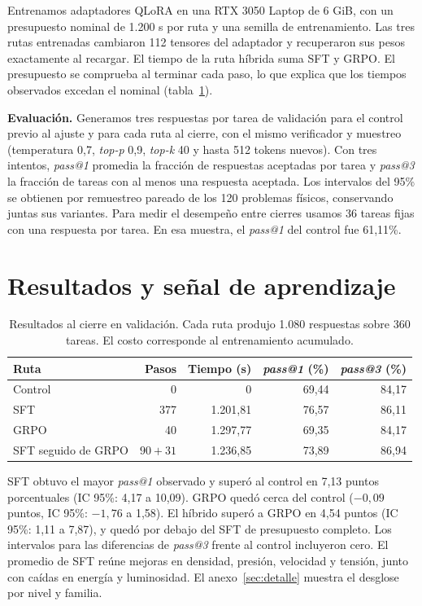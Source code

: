 Entrenamos adaptadores QLoRA en una RTX 3050 Laptop de 6 GiB, con un presupuesto
nominal de 1.200 s por ruta y una semilla de entrenamiento. Las tres rutas
entrenadas cambiaron 112 tensores del adaptador y recuperaron sus pesos
exactamente al recargar. El tiempo de la ruta híbrida suma SFT y GRPO. El
presupuesto se comprueba al terminar cada paso, lo que explica que los tiempos
observados excedan el nominal (tabla~\ref{tab:resultado}).

\textbf{Evaluación.} Generamos tres respuestas por tarea de validación para el
control previo al ajuste y para cada ruta al cierre, con el mismo verificador
y muestreo (temperatura 0,7, \textit{top-p} 0,9, \textit{top-k} 40 y hasta 512
tokens nuevos). Con tres intentos, \textit{pass@1} promedia la fracción de respuestas
aceptadas por tarea y \textit{pass@3} la fracción de tareas con al menos una
respuesta aceptada. Los intervalos del 95\% se obtienen por remuestreo pareado
de los 120 problemas físicos, conservando juntas sus variantes. Para medir el
desempeño entre cierres usamos 36 tareas fijas con una respuesta por tarea. En esa
muestra, el \textit{pass@1} del control fue 61,11\%.

\section{Resultados y señal de aprendizaje}

\begin{table}[ht]
\centering
\caption{Resultados al cierre en validación. Cada ruta produjo 1.080 respuestas
sobre 360 tareas. El costo corresponde al entrenamiento acumulado.}
\label{tab:resultado}
\begin{tabular}{lrrrr}
\toprule
Ruta & Pasos & Tiempo (s) & \textit{pass@1} (\%) & \textit{pass@3} (\%) \\
\midrule
Control & 0 & 0 & 69,44 & 84,17 \\
SFT & 377 & 1.201,81 & 76,57 & 86,11 \\
GRPO & 40 & 1.297,77 & 69,35 & 84,17 \\
SFT seguido de GRPO & $90+31$ & 1.236,85 & 73,89 & 86,94 \\
\bottomrule
\end{tabular}
\end{table}

SFT obtuvo el mayor \textit{pass@1} observado y superó al control en 7,13
puntos porcentuales (IC 95\%: 4,17 a 10,09). GRPO quedó cerca del control
($-0,09$ puntos, IC 95\%: $-1,76$ a 1,58). El híbrido superó a GRPO en 4,54
puntos (IC 95\%: 1,11 a 7,87), y quedó por debajo del SFT de presupuesto
completo. Los intervalos para las diferencias de \textit{pass@3} frente al
control incluyeron cero. El promedio de SFT reúne mejoras en densidad, presión,
velocidad y tensión, junto con caídas en energía y luminosidad. El
anexo~\ref{sec:detalle} muestra el desglose por nivel y familia.

